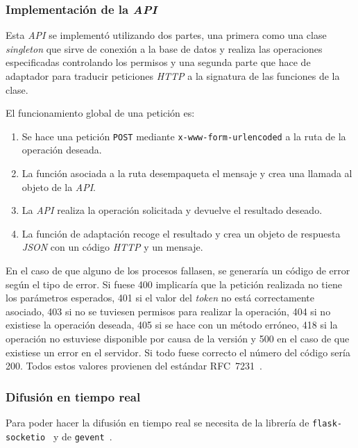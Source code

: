 \subsubsection{Implementación de la \textit{API}}
Esta \textit{API} se implementó utilizando dos partes, una primera como una clase \textit{singleton} que sirve de conexión a la base de datos y realiza las operaciones especificadas controlando los permisos y una segunda parte que hace de adaptador para traducir peticiones \textit{HTTP} a la signatura de las funciones de la clase.

El funcionamiento global de una petición es:
\begin{enumerate}
	\item Se hace una petición \texttt{POST} mediante \texttt{x-www-form-urlencoded} a la ruta de la operación deseada.
	
	\item La función asociada a la ruta desempaqueta el mensaje y crea una llamada al objeto de la \textit{API}.
	
	\item La \textit{API} realiza la operación solicitada y devuelve el resultado deseado.
	
	\item La función de adaptación recoge el resultado y crea un objeto de respuesta \textit{JSON} con un código \textit{HTTP} y un mensaje.
\end{enumerate}

En el caso de que alguno de los procesos fallasen, se generaría un código de error según el tipo de error. Si fuese 400 implicaría que la petición realizada no tiene los parámetros esperados, 401 si el valor del \textit{token} no está correctamente asociado, 403 si no se tuviesen permisos para realizar la operación, 404 si no existiese la operación deseada, 405 si se hace con un método erróneo, 418 si la operación no estuviese disponible por causa de la versión y 500 en el caso de que existiese un error en el servidor. Si todo fuese correcto el número del código sería 200. Todos estos valores provienen del estándar RFC~7231~\cite{RFC7231}.

\subsubsection{Difusión en tiempo real}
Para poder hacer la difusión en tiempo real se necesita de la librería de \texttt{flask-socketio}~\cite{tool:flask-socketio} y de \texttt{gevent}~\cite{tool:gevent}. 

